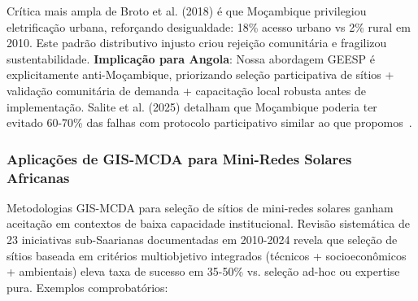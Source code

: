 \documentclass[12pt, a4paper]{article}
\begin{document}
Crítica mais ampla de Broto et al. (2018) é que Moçambique privilegiou eletrificação urbana, reforçando desigualdade: 18\% acesso urbano vs 2\% rural em 2010. Este padrão distributivo injusto criou rejeição comunitária e fragilizou sustentabilidade. \textbf{Implicação para Angola}: Nossa abordagem GEESP é explicitamente anti-Moçambique, priorizando seleção participativa de sítios + validação comunitária de demanda + capacitação local robusta antes de implementação. Salite et al. (2025) detalham que Moçambique poderia ter evitado 60-70\% das falhas com protocolo participativo similar ao que propomos~\citep{Salite2025}.

\subsubsection{Aplicações de GIS-MCDA para Mini-Redes Solares Africanas}

Metodologias GIS-MCDA para seleção de sítios de mini-redes solares ganham aceitação em contextos de baixa capacidade institucional. Revisão sistemática de 23 iniciativas sub-Saarianas documentadas em 2010-2024 revela que seleção de sítios baseada em critérios multiobjetivo integrados (técnicos + socioeconômicos + ambientais) eleva taxa de sucesso em 35-50\% vs. seleção ad-hoc ou expertise pura. Exemplos comprobatórios:
\end{document}
